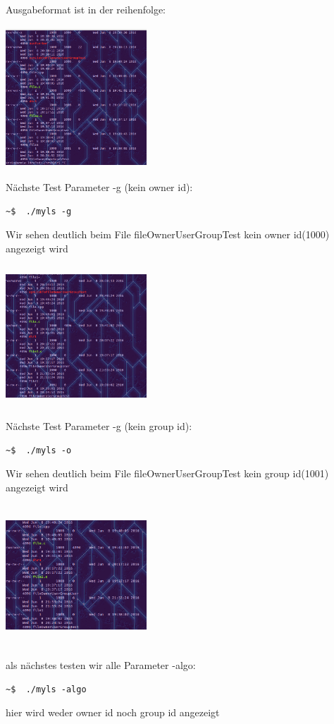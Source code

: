 Ausgabeformat ist in der reihenfolge:

\includegraphics[width=200px, height = 200px]{image/ausgabe-l}

Nächste Test Parameter -g (kein owner id):
\begin{lstlisting}
~$	./myls -g
\end{lstlisting}
Wir sehen deutlich beim File fileOwnerUserGroupTest kein owner id(1000) angezeigt wird

\includegraphics[width=200px, height = 200px]{image/ausgabe-g}

Nächste Test Parameter -g (kein group id):
\begin{lstlisting}
~$	./myls -o
\end{lstlisting}
Wir sehen deutlich beim File fileOwnerUserGroupTest kein group id(1001) angezeigt wird

\includegraphics[width=200px, height = 200px]{image/ausgabe-o}

als nächstes testen wir alle Parameter -algo:
\begin{lstlisting}
~$	./myls -algo
\end{lstlisting}
hier wird weder owner id noch group id angezeigt

